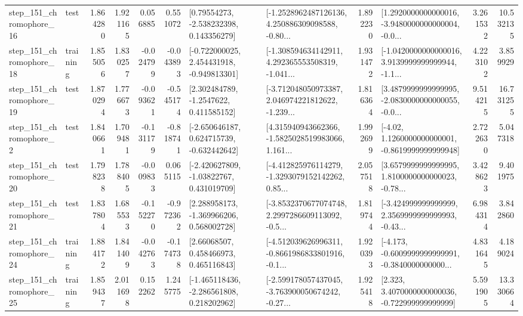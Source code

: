 \begin{tabular}{llrrrrllrlrr}
  step\_151\_chromophore\_16 &      test &      1.864280 &    1.921165 &      0.056885 &  0.551072 &     [0.79554273, -2.538232398, 0.143356279] &  [-1.2528962487126136, 4.250886309098588, -0.80... &       1.892230 &  [1.2920000000000016, -3.9480000000000004, -0.0... &            3.261532 &         10.532135 \\
  step\_151\_chromophore\_18 &  training &      1.855056 &    1.830257 &     -0.024799 & -0.043893 &   [-0.722000025, 2.454431918, -0.949813301] &  [-1.308594634142911, 4.292365553508319, -1.041... &       1.931472 &  [-1.0420000000000016, 3.9139999999999944, -1.1... &            4.223102 &          3.859929 \\
  step\_151\_chromophore\_19 &      test &      1.870294 &    1.776673 &     -0.093621 & -0.545174 &      [2.302484789, -1.2547622, 0.411585152] &  [-3.712048050973387, 2.046974221812622, -1.239... &       1.816364 &  [3.4879999999999995, -2.0830000000000055, -0.0... &            9.514215 &         16.731255 \\
   step\_151\_chromophore\_2 &      test &      1.840661 &    1.709481 &     -0.131179 & -0.818741 &   [-2.650646187, 0.624715739, -0.632442642] &  [4.315940943662366, -1.5825028519983066, 1.161... &       1.992699 &   [-4.02, 1.1260000000000001, -0.8619999999999948] &            2.722630 &          5.047318 \\
  step\_151\_chromophore\_20 &      test &      1.798238 &    1.788405 &     -0.009833 &  0.065115 &    [-2.420627809, -1.03822767, 0.431019709] &  [-4.412825976114279, -1.3293079152142262, 0.85... &       2.057518 &  [3.6579999999999995, 1.8100000000000023, -0.78... &            3.428623 &          9.401975 \\
  step\_151\_chromophore\_21 &      test &      1.837804 &    1.685533 &     -0.152270 & -0.972362 &    [2.288958173, -1.369966206, 0.568002728] &  [-3.8532370677074748, 2.2997286609113092, -0.5... &       1.819744 &  [-3.424999999999999, 2.3569999999999993, -0.43... &            6.984314 &          3.842860 \\
  step\_151\_chromophore\_24 &  training &      1.884172 &    1.841409 &     -0.042763 & -0.174738 &      [2.66068507, 0.458466973, 0.465116843] &  [-4.512039626996311, -0.8661986833801916, -0.1... &       1.920393 &  [-4.173, -0.6009999999999991, -0.3840000000000... &            4.831645 &          4.189024 \\
  step\_151\_chromophore\_25 &  training &      1.859437 &    2.011698 &      0.152262 &  1.245775 &   [-1.465118436, -2.286561808, 0.218202962] &  [-2.599178057437045, -3.763900050674242, -0.27... &       1.925418 &    [2.323, 3.4070000000000036, -0.722999999999999] &            5.591905 &         13.330664 \\

\end{tabular}
